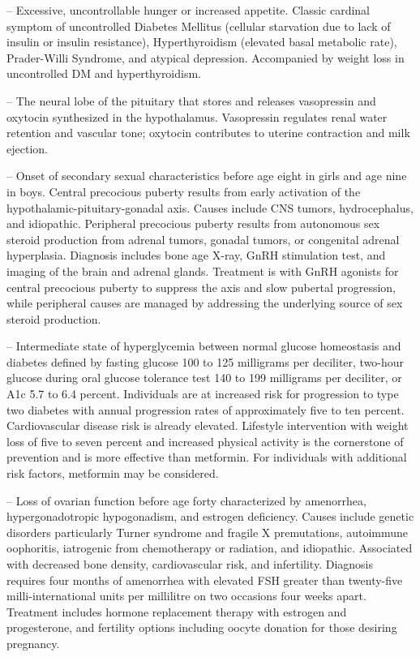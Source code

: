 -- Excessive, uncontrollable hunger or increased appetite. Classic cardinal symptom of uncontrolled Diabetes Mellitus (cellular starvation due to lack of insulin or insulin resistance), Hyperthyroidism (elevated basal metabolic rate), Prader-Willi Syndrome, and atypical depression. Accompanied by weight loss in uncontrolled DM and hyperthyroidism.

-- The neural lobe of the pituitary that stores and releases vasopressin and oxytocin synthesized in the hypothalamus. Vasopressin regulates renal water retention and vascular tone; oxytocin contributes to uterine contraction and milk ejection.

-- Onset of secondary sexual characteristics before age eight in girls and age nine in boys. Central precocious puberty results from early activation of the hypothalamic-pituitary-gonadal axis. Causes include CNS tumors, hydrocephalus, and idiopathic. Peripheral precocious puberty results from autonomous sex steroid production from adrenal tumors, gonadal tumors, or congenital adrenal hyperplasia. Diagnosis includes bone age X-ray, GnRH stimulation test, and imaging of the brain and adrenal glands. Treatment is with GnRH agonists for central precocious puberty to suppress the axis and slow pubertal progression, while peripheral causes are managed by addressing the underlying source of sex steroid production.

-- Intermediate state of hyperglycemia between normal glucose homeostasis and diabetes defined by fasting glucose 100 to 125 milligrams per deciliter, two-hour glucose during oral glucose tolerance test 140 to 199 milligrams per deciliter, or A1c 5.7 to 6.4 percent. Individuals are at increased risk for progression to type two diabetes with annual progression rates of approximately five to ten percent. Cardiovascular disease risk is already elevated. Lifestyle intervention with weight loss of five to seven percent and increased physical activity is the cornerstone of prevention and is more effective than metformin. For individuals with additional risk factors, metformin may be considered.

-- Loss of ovarian function before age forty characterized by amenorrhea, hypergonadotropic hypogonadism, and estrogen deficiency. Causes include genetic disorders particularly Turner syndrome and fragile X premutations, autoimmune oophoritis, iatrogenic from chemotherapy or radiation, and idiopathic. Associated with decreased bone density, cardiovascular risk, and infertility. Diagnosis requires four months of amenorrhea with elevated FSH greater than twenty-five milli-international units per millilitre on two occasions four weeks apart. Treatment includes hormone replacement therapy with estrogen and progesterone, and fertility options including oocyte donation for those desiring pregnancy.

